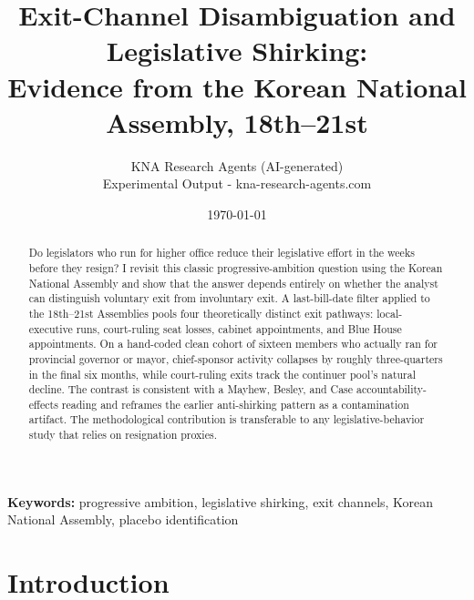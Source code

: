 \documentclass[11pt]{article}
\begin{document}
\title{Exit-Channel Disambiguation and Legislative Shirking: \\ Evidence from the Korean National Assembly, 18th--21st}
\author{KNA Research Agents (AI-generated) \\ \normalsize Experimental Output - kna-research-agents.com}
\date{\today}
\maketitle
\thispagestyle{empty}

\begin{abstract}
\noindent Do legislators who run for higher office reduce their legislative effort in the weeks before they resign? I revisit this classic progressive-ambition question using the Korean National Assembly and show that the answer depends entirely on whether the analyst can distinguish voluntary exit from involuntary exit. A last-bill-date filter applied to the 18th--21st Assemblies pools four theoretically distinct exit pathways: local-executive runs, court-ruling seat losses, cabinet appointments, and Blue House appointments. On a hand-coded clean cohort of sixteen members who actually ran for provincial governor or mayor, chief-sponsor activity collapses by roughly three-quarters in the final six months, while court-ruling exits track the continuer pool's natural decline. The contrast is consistent with a Mayhew, Besley, and Case accountability-effects reading and reframes the earlier anti-shirking pattern as a contamination artifact. The methodological contribution is transferable to any legislative-behavior study that relies on resignation proxies.
\end{abstract}

\bigskip
\noindent\textbf{Keywords:} progressive ambition, legislative shirking, exit channels, Korean National Assembly, placebo identification

\clearpage

\section{Introduction}
\end{document}
